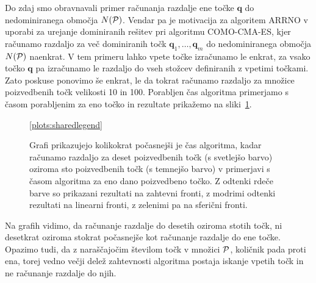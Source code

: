 Do zdaj smo obravnavali primer računanja razdalje ene točke $\textbf{q}$ do nedominiranega območja $N(\P)$. Vendar pa je motivacija za algoritem ARRNO v uporabi za urejanje dominiranih rešitev pri algoritmu COMO-CMA-ES, kjer računamo razdaljo za več dominiranih točk $\textbf{q}_1, \dots, \textbf{q}_m$ do nedominiranega območja $N(\P)$ naenkrat. V tem primeru lahko vpete točke izračunamo le enkrat, za vsako točko $\textbf{q}$ pa izračunamo le razdaljo do vseh stožcev definiranih z vpetimi točkami. Zato poskuse ponovimo še enkrat, le da tokrat računamo razdaljo za množice poizvedbenih točk velikosti 10 in 100. Porabljen čas algoritma primerjamo s časom porabljenim za eno točko in rezultate prikažemo na sliki~\ref{fig:performance_mulitple}. 
\begin{figure}[htb]
    \centering
    \begin{subfigure}{0.49\textwidth}
        \centering
        
    \end{subfigure}
    \hfill
    \begin{subfigure}{0.49\textwidth}
        \centering
         
    \end{subfigure}

    \vspace{0.5cm}

    \begin{subfigure}{0.49\textwidth}
        \centering
        
    \end{subfigure}
    \hfill
    \begin{subfigure}{0.49\textwidth}
        \centering
         
    \end{subfigure}

    \ref{plots:sharedlegend}

    \caption{Grafi prikazujejo kolikokrat počasnejši je čas algoritma, kadar računamo razdaljo za deset poizvedbenih točk (s svetlejšo barvo) oziroma sto poizvedbenih točk (s temnejšo barvo) v primerjavi s časom algoritma za eno dano poizvedbeno točko. Z odtenki rdeče barve so prikazani rezultati na zahtevni fronti, z modrimi odtenki rezultati na linearni fronti, z zelenimi pa na sferični fronti.}
    \label{fig:performance_mulitple}
\end{figure}

\vspace{40pt} %
Na grafih vidimo, da računanje razdalje do desetih oziroma stotih točk, ni desetkrat oziroma stokrat počasnejše kot računanje razdalje do ene točke. Opazimo tudi, da z naraščajočim številom točk v množici $\P$, količnik pada proti ena, torej vedno večji delež zahtevnosti algoritma postaja iskanje vpetih točk in ne računanje razdalje do njih. 

